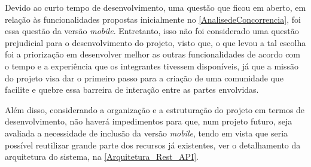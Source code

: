 Devido ao curto tempo de desenvolvimento, uma questão que ficou em aberto, em relação às funcionalidades propostas inicialmente no \autoref{AnalisedeConcorrencia}, foi essa questão da versão \textit{mobile}. Entretanto, isso não foi considerado uma questão prejudicial para o desenvolvimento do projeto, visto que, o que levou a tal escolha foi a priorização em desenvolver melhor as outras funcionalidades de acordo com o tempo e a experiência que os integrantes tivessem disponíveis, já que a missão do projeto visa dar o primeiro passo para a  criação de uma comunidade que facilite e quebre essa barreira de interação entre as partes envolvidas.

Além disso, considerando a organização e a estruturação do projeto em termos de desenvolvimento, não haverá impedimentos para que, num projeto futuro, seja avaliada a necessidade de inclusão da versão \textsl{mobile}, tendo em vista que seria possível reutilizar grande parte dos recursos já existentes, ver o detalhamento da arquitetura do sistema, na \autoref{Arquitetura_Rest_API}.
